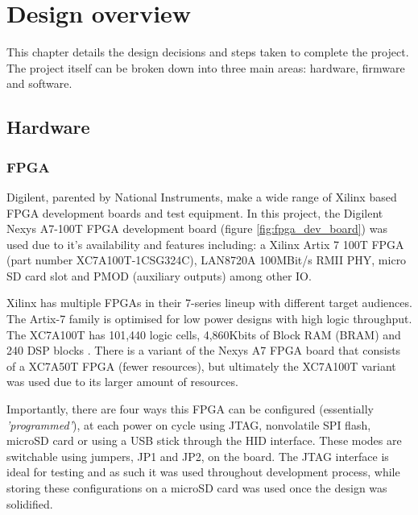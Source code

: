 
\chapter[Design overview]{Design overview}
\label{chap:methodology}	%
\pagestyle{headings}

This chapter details the design decisions and steps taken to complete the project. The project itself can be broken down into three main areas: hardware, firmware and software. 


\section{Hardware}
\subsection{FPGA}
Digilent, parented by National Instruments, make a wide range of Xilinx based FPGA development boards and test equipment. In this project, the Digilent Nexys A7-100T FPGA development board (figure \ref{fig:fpga_dev_board}) was used due to it's availability and features including: a Xilinx Artix 7 100T FPGA (part number XC7A100T-1CSG324C), LAN8720A 100MBit/s RMII PHY, micro SD card slot and PMOD (auxiliary outputs) among other IO. 

Xilinx has multiple FPGAs in their 7-series lineup with different target audiences. The Artix-7 family is optimised for low power designs with high logic throughput. The XC7A100T has 101,440 logic cells, 4,860Kbits of Block RAM (BRAM) and 240 DSP blocks \cite{Xilinx7SeriesDatasheet}. There is a variant of the Nexys A7 FPGA board that consists of a XC7A50T FPGA (fewer resources), but ultimately the XC7A100T variant was used due to its larger amount of resources.  

Importantly, there are four ways this FPGA can be configured (essentially \textit{'programmed'}), at each power on cycle using JTAG, nonvolatile SPI flash, microSD card or using a USB stick through the HID interface. These modes are switchable using jumpers, JP1 and JP2, on the board. The JTAG interface is ideal for testing and as such it was used throughout development process, while storing these configurations on a microSD card was used once the design was solidified. 

